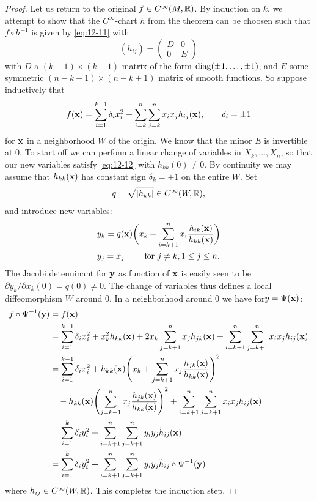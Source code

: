 \begin{proof}
Let us return to the original $f\in C^\infty(M, {\mathbb{R}})$. By induction on $k$, we attempt to
show that the $C^\infty$-chart $h$ from the theorem can be choosen such that $f\circ h^{-1}$
is given by \eqref{eq:12-11} with
\[
  (h_{ij}) = \begin{pmatrix}
    D & 0\\
    0 & E
  \end{pmatrix}
\]
with $D$ a $(k - 1)\times(k - 1)$ matrix of the form $\mathrm{diag}(\pm1,\ldots, \pm1)$, and $E$ some
symmetric $(n-k+1)\times(n-k+1)$ matrix of smooth functions. So suppose inductively that
\begin{align}\label{eq:12-12}
  f(\mathbf{x}) = \sum_{i=1}^{k-1}{\delta_ix_i^2} + \sum_{i=k}^{n}{\sum_{j=k}^{n}{x_ix_jh_{ij}(\mathbf{x})}}
  ,\qquad \delta_i = \pm1
\end{align}
for $\mathbf{x}$ in a neighborhood $W$ of the origin. We know that the minor $E$ is invertible
at 0. To start off we can perfonn a linear change of variables in $X_k,\ldots,X_n$, so
that our new variables satisfy \eqref{eq:12-12} with $h_{kk}(0)\neq 0$. By continuity we may assume
that $h_{kk}(\mathbf{x})$ has constant sign $\delta_k = \pm1$ on the entire $W$. Set
\[
  q = \sqrt{|h_{kk}|}\in C^\infty(W, {\mathbb{R}}),
\]
and introduce new variables:
\begin{align*}
  & y_k = q(\mathbf{x})\biggl(x_k + \sum_{i=k+1}^{n }{x_i\frac{h_{ik}(\mathbf{x})}{h_{kk}(\mathbf{x})}}\biggr) \\
  & y_j = x_j \qquad \text{ for } j\neq k, 1\le j\le n. 
\end{align*}
The Jacobi detenninant for $\mathbf{y}$ as function of $\mathbf{x}$ is easily seen to be $\partial y_k/\partial x_k(0)=q(0)\neq 0$. 
The change of variables thus defines a local diffeomorphism $W$ around 0. In a neighborhood around 0 we have for$ y = \Psi(\mathbf{x})$:
\begin{align*}
  f\circ\Psi^{-1}(\mathbf{y})
  & = f(\mathbf{x}) \\
  & = \sum_{i=1}^{k-1}{\delta_ix_i^2 + x_k^2h_{kk}(\mathbf{x})} 
    + 2x_k \sum_{j=k+1}^{n}{x_jh_{jk}(\mathbf{x})} 
    + \sum_{i=k+1}^{n}{\sum_{j=k+1}^{n}{x_ix_jh_{ij}(\mathbf{x})}} \\
  & = \sum_{i=1}^{k-1}{\delta_ix_i^2} 
    + h_{kk}(\mathbf{x})\Biggl(x_k + \sum_{j=k+1}^{n}{x_j\frac{h_{jk}(\mathbf{x})}{h_{kk}(\mathbf{x})}}\Biggr)^2 \\
  & \quad - h_{kk}(\mathbf{x})\Biggl(\sum_{j=k+1}^{n}{x_j\frac{h_{jk}(\mathbf{x})}{h_{kk}(\mathbf{x})}}\Biggr)^2 
    + \sum_{i=k+1}^{n}{\sum_{j=k+1}^{n}{x_ix_jh_{ij}(\mathbf{x})}} \\
  & = \sum_{i=1}^{k }{\delta_iy_i^2} + \sum_{i=k+1}^{n}{\sum_{j=k+1}^{n}{y_iy_j\tilde h_{ij}(\mathbf{x})}} \\
  & = \sum_{i=1}^{k }{\delta_iy_i^2} + \sum_{i=k+1}^{n}{\sum_{j=k+1}^{n}{y_iy_j\tilde h_{ij}\circ\Psi^{-1}(\mathbf{y})}}
\end{align*}
where $\tilde{h}_{ij}\in C^\infty(W, {\mathbb{R}})$. This completes the induction step.
\end{proof}

